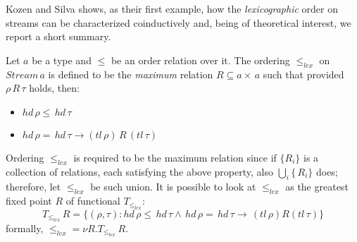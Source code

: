 Kozen and Silva shows, as their first example, how the \emph{lexicographic} order
on streams can be characterized coinductively and, being of theoretical interest,
we report a short summary.

Let $a$ be a type and $\leq$ be an order relation over it. The ordering $\leq_{lex}$
on $Stream\,a$ is defined to be the \emph{maximum} relation $R\subseteq a\times\,a$ 
such that provided $\rho\,R\,\tau$ holds, then:
\begin{itemize}
    \item $hd\,\rho\leq\,hd\,\tau$ 
    \item $hd\,\rho=\,hd\,\tau \rightarrow (tl\,\rho)\,R\,(tl\,\tau)$ 
\end{itemize}
Ordering $\leq_{lex}$ is required to be the maximum relation since if 
$\lbrace R_{i}\rbrace$ is a collection of relations, each satisfying the above
property, also $\bigcup_{i}\lbrace\,R_{i}\rbrace$ does; therefore, let $\leq_{lex}$
be such union. It is possible to look at $\leq_{lex}$ as the greatest fixed point $R$
of functional $T_{\leq_{lex}}$:
\begin{displaymath}
    T_{\leq_{lex}}\,R = \lbrace (\rho,\tau) : hd\,\rho \leq\,hd\,\tau\wedge\,
        hd\,\rho=\,hd\,\tau\rightarrow\,(tl\,\rho) R (tl\,\tau) \rbrace
\end{displaymath}
formally, $\leq_{lex} = \nu R. T_{\leq_{lex}}\,R$.











